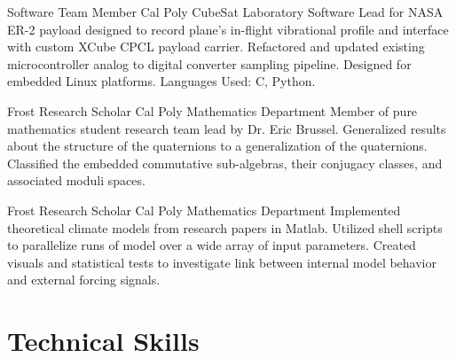 \documentclass[letterpaper, 11pt, sans]{moderncv}
\begin{document}
        {Software Team Member}
        {Cal Poly CubeSat Laboratory}{}{}
        {
            Software Lead for NASA ER-2 payload designed to record plane's
            in-flight vibrational profile and interface with custom XCube CPCL
            payload carrier.\newline
            Refactored and updated existing microcontroller analog to digital
            converter sampling pipeline.
            Designed for embedded Linux platforms. Languages Used: C, Python.\newline
        }

        {Frost Research Scholar}
        {Cal Poly Mathematics Department}{}{}
        {
            Member of pure mathematics student research team lead by Dr. Eric
            Brussel.\newline
            Generalized results about the structure of the quaternions to a
            generalization of the quaternions.\newline
            Classified the embedded commutative sub-algebras, their conjugacy
            classes, and associated moduli spaces.\newline 
        }

        {Frost Research Scholar}
        {Cal Poly Mathematics Department}{}{}
        {
            Implemented theoretical climate models from research papers in Matlab.\newline
            Utilized shell scripts to parallelize runs of model over a wide
            array of input parameters.\newline
            Created visuals and statistical tests to investigate link between
            internal model behavior and external forcing signals.\newline 
        }


\section{Technical Skills}

\end{document}
